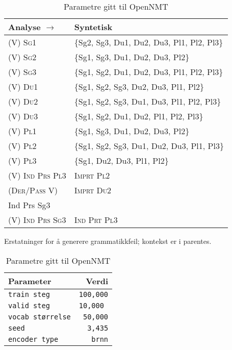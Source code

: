 \documentclass{flammie}
\begin{document}
\begin{table}[htb]
\begin{minipage}{0.63\textwidth}
    \begin{tabular}{l|l}
        \hline
         \textbf{Analyse} $\rightarrow$ & \textbf{Syntetisk} \\
         \hline
         \textsc{(V) Sg1} & \{Sg2, Sg3, Du1, Du2, Du3, Pl1, Pl2, Pl3\}  \\
         \textsc{(V) Sg2} & \{Sg1, Sg3, Du1, Du2, Du3, Pl2\}  \\
         \textsc{(V) Sg3} & \{Sg1, Sg2, Du1, Du2, Du3, Pl1, Pl2, Pl3\}  \\
         \textsc{(V) Du1} & \{Sg1, Sg2, Sg3, Du2, Du3, Pl1, Pl2\}  \\
         \textsc{(V) Du2} & \{Sg1, Sg2, Sg3, Du1, Du3, Pl1, Pl2, Pl3\}  \\
         \textsc{(V) Du3} & \{Sg1, Sg2, Du1, Du2, Pl1, Pl2, Pl3\}  \\
         \textsc{(V) Pl1} & \{Sg1, Sg3, Du1, Du2, Du3, Pl2\}  \\
         \textsc{(V) Pl2} & \{Sg1, Sg2, Sg3, Du1, Du2, Du3, Pl1, Pl3\}  \\
         \textsc{(V) Pl3} & \{Sg1, Du2, Du3, Pl1, Pl2\}  \\
         \hline
         \textsc{(V) Ind Prs Pl3} & \textsc{Imprt Pl2} \\
         \textsc{(Der/Pass V)} & \textsc{Imprt Du2} \\
         {Ind Prs Sg3} &  \\
         \textsc{(V) Ind Prs Sg3} & \textsc{Ind Prt Pl3} \\
         \hline
    \end{tabular}
    \caption{Erstatninger for å generere grammatikkfeil; kontekst er i parentes.
    \label{table:ersetzt}}
    \end{minipage}
    \begin{minipage}{0.28\textwidth}
   \begin{tabular}{l|r}
   \hline
   \bf Parameter & \bf Verdi \\
   \hline
        \texttt{train steg} & \texttt{100,000} \\
        \texttt{valid steg} & \texttt{10,000 }\\
        \texttt{vocab størrelse} & \texttt{50,000} \\
        \texttt{seed} & \texttt{3,435} \\
        \texttt{encoder type} & \texttt{brnn} \\
        \hline
   \end{tabular}
   \caption{Parametre gitt til OpenNMT}
   \label{table:params}
    \end{minipage}
\end{table}
\end{document}
